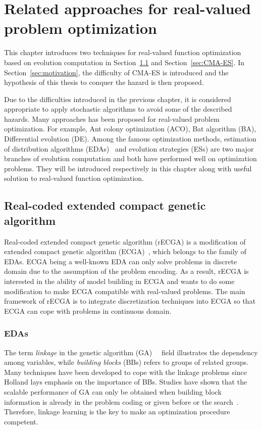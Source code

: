 \chapter{Related approaches for real-valued problem optimization}
\label{ch:Approaches-for-real-valued-problem}

This chapter introduces two techniques for real-valued function optimization
based on evolution computation in Section~\ref{sec:rECGA} and Section~\ref{sec:CMA-ES}.
In Section~\ref{sec:motivation}, the difficulty of CMA-ES is introduced and the
hypothesis of this thesis to conquer the hazard is then proposed.

Due to the difficulties introduced in the previous chapter, it is considered
appropriate to apply stochastic algorithms to avoid some of the described
hazards.  Many approaches has been proposed for real-valued problem
optimization.  For example, Ant colony optimization (ACO), Bat algorithm (BA),
Differential evolution (DE).  Among the famous optimization methods, estimation
of distribution algorithms (EDAs)~\cite{Pelikan:2012:EDA} and evolution strategies (ESs) are two major
branches of evolution computation and both have performed well on optimization
problems.  They will be introduced respectively in this chapter along with
useful solution to real-valued function optimization. 


\section{Real-coded extended compact genetic algorithm}
\label{sec:rECGA}

Real-coded extended compact genetic algorithm (rECGA) is a modification
of extended compact genetic algorithm (ECGA)~\cite{Harik:1999:ecga}, which belongs to the
family of EDAs.  ECGA being a well-known EDA can only solve problems in
discrete domain due to the assumption of the problem encoding.  As a
result, rECGA is interested in the ability of model building in ECGA and
wants to do some modification to make ECGA compatible with real-valued
problems.  The main framework of rECGA is to integrate discretization
techniques into ECGA so that ECGA can cope with problems in continuous
domain.  \subsection{EDAs}

The term \emph{linkage} in the genetic algorithm
(GA)~\cite{Holland:1975}~\cite{Goldberg:1989:ga-book} field illustrates
the dependency among variables, while \emph{building blocks} (BBs)
refers to groups of related groups.  Many techniques have been developed
to cope with the linkage problems since Holland lays emphasis on the
importance of BBs.  Studies have shown that the scalable performance of
GA can only be obtained when building block information is already in
the problem coding or given before or the
search~\cite{thierens1999scalability}.  Therefore, linkage
learning is the key to make an optimization procedure competent.


